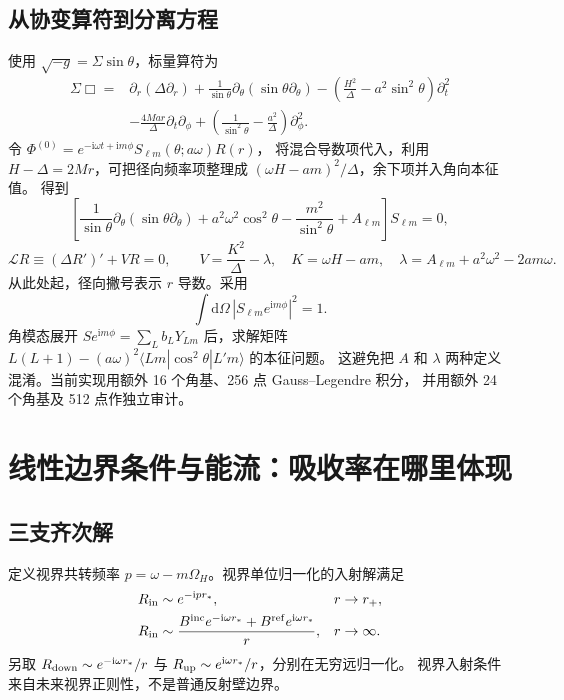 \documentclass[UTF8,fontset=fandol,11pt,a4paper]{ctexart}
\newcommand{\ii}{\mathrm{i}}
\newcommand{\dd}{\mathrm{d}}
\newcommand{\Bin}{B^{\mathrm{inc}}}
\newcommand{\Bref}{B^{\mathrm{ref}}}
\numberwithin{equation}{section}
\begin{document}
\subsection{从协变算符到分离方程}
使用 $\sqrt{-g}=\Sigma\sin\theta$，标量算符为
\begin{align}
\Sigma\Box={}&\partial_r(\Delta\partial_r)
+\frac1{\sin\theta}\partial_\theta(\sin\theta\partial_\theta)
-\left(\frac{H^2}{\Delta}-a^2\sin^2\theta\right)\partial_t^2\nonumber\\
&-\frac{4Mar}{\Delta}\partial_t\partial_\phi
+\left(\frac1{\sin^2\theta}-\frac{a^2}{\Delta}\right)\partial_\phi^2.
\end{align}
令 $\Phi^{(0)}=e^{-\ii\omega t+\ii m\phi}S_{\ell m}(\theta;a\omega)R(r)$，
将混合导数项代入，利用 $H-\Delta=2Mr$，可把径向频率项整理成
$(\omega H-am)^2/\Delta$，余下项并入角向本征值。
得到\cite{Teukolsky1973}
\begin{equation}
\left[\frac1{\sin\theta}\partial_\theta(\sin\theta\partial_\theta)
+a^2\omega^2\cos^2\theta-\frac{m^2}{\sin^2\theta}+A_{\ell m}\right]S_{\ell m}=0,
\end{equation}
\begin{equation}
\mathcal L R\equiv(\Delta R')'+VR=0,\qquad
V=\frac{K^2}{\Delta}-\lambda,\quad K=\omega H-am,
\quad\lambda=A_{\ell m}+a^2\omega^2-2am\omega.\label{radial}
\end{equation}
从此处起，径向撇号表示 $r$ 导数。采用
\begin{equation}\int\dd\Omega\,|S_{\ell m}e^{\ii m\phi}|^2=1.\end{equation}
角模态展开 $S e^{\ii m\phi}=\sum_L b_L Y_{Lm}$ 后，求解矩阵
$L(L+1)-(a\omega)^2\langle Lm|\cos^2\theta|L'm\rangle$ 的本征问题。
这避免把 $A$ 和 $\lambda$ 两种定义混淆。当前实现用额外 16 个角基、256 点 Gauss--Legendre 积分，
并用额外 24 个角基及 512 点作独立审计。

\section{线性边界条件与能流：吸收率在哪里体现}
\subsection{三支齐次解}
定义视界共转频率 $p=\omega-m\Omega_H$。视界单位归一化的入射解满足
\begin{align}
R_{\rm in}&\sim e^{-\ii p r_*},&&r\to r_+,\\
R_{\rm in}&\sim\frac{\Bin e^{-\ii\omega r_*}+\Bref e^{\ii\omega r_*}}r,
&&r\to\infty.
\end{align}
另取 $R_{\rm down}\sim e^{-\ii\omega r_*}/r$ 与
$R_{\rm up}\sim e^{\ii\omega r_*}/r$，分别在无穷远归一化。
视界入射条件来自未来视界正则性，不是普通反射壁边界。
\end{document}
